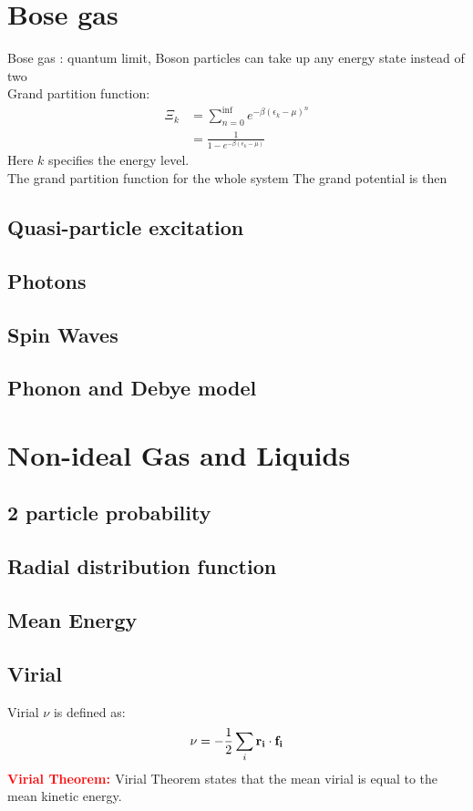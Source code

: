 \documentclass[10pt,a4paper]{article}
\newcommand{\theorem}[2]{\textbf{\textcolor{red}{#1: }}{#2}\\}
\begin{document}
\section{Bose gas}
    Bose gas : quantum limit, Boson particles can take up any energy state instead of two\\
    Grand partition function:
    \begin{align*}
    \Xi_k   &= \sum_{n=0}^{\inf} e^{-\beta(\epsilon_k-\mu)^n}\\
            &=\frac{1}{1-e^{-\beta(\epsilon_k-\mu)}}
    \end{align*}
    Here $k$ specifies the energy level.\\
    The grand partition function for the whole system
    The grand potential is then
\subsection{Quasi-particle excitation}
\subsection{Photons}
\subsection{Spin Waves}
\subsection{Phonon and Debye model}
\section{Non-ideal Gas and Liquids}
\subsection{2 particle probability}
\subsection{Radial distribution function}

\subsection{Mean Energy}
\subsection{Virial}
Virial $\nu$ is defined as: 
\begin{align*}
    \nu = -\dfrac{1}{2} \sum_i {\vb{r_i}\cdot \vb{f_i}}
\end{align*}
\theorem{Virial Theorem}{Virial Theorem states that the mean virial is equal to the mean kinetic energy.}
\end{document}
